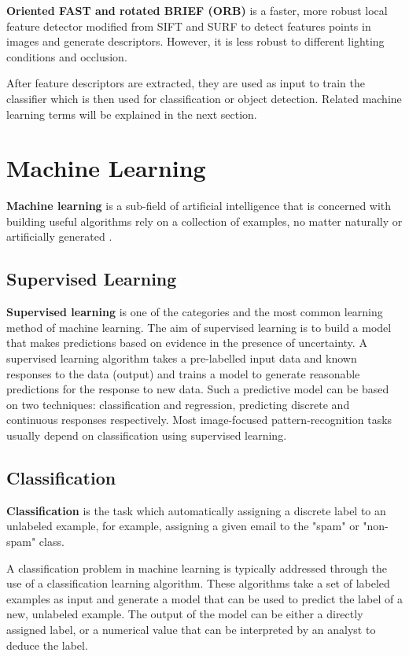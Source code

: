 \textbf{Oriented FAST and rotated BRIEF (ORB)} \cite{rublee2011orb} is a faster, more robust local feature detector modified from SIFT and SURF to detect features points in images and generate descriptors. However, it is less robust to different lighting conditions and occlusion.

After feature descriptors are extracted, they are used as input to train the classifier which is then used for classification or object detection. Related machine learning terms will be explained in the next section.

\section{Machine Learning}

\textbf{Machine learning} is a sub-field of artificial intelligence that is concerned with building useful algorithms rely on a collection of examples, no matter naturally or artificially generated \cite{burkov2019hundred}.

\subsection{Supervised Learning}

\textbf{Supervised learning} is one of the categories and the most common learning method of machine learning. The aim of supervised learning is to build a model that makes predictions based on evidence in the presence of uncertainty. A supervised learning algorithm takes a pre-labelled input data and known responses to the data (output) and trains a model to generate reasonable predictions for the response to new data. Such a predictive model can be based on two techniques: classification and regression, predicting discrete and continuous responses respectively. Most image-focused pattern-recognition tasks usually depend on classification using supervised learning.

\subsection{Classification}

\textbf{Classification} is the task which automatically assigning a discrete label to an unlabeled example, for example, assigning a given email to the "spam" or "non-spam" class. \cite{burkov2019hundred}

A classification problem in machine learning is typically addressed through the use of a classification learning algorithm. These algorithms take a set of labeled examples as input and generate a model that can be used to predict the label of a new, unlabeled example. The output of the model can be either a directly assigned label, or a numerical value that can be interpreted by an analyst to deduce the label.


